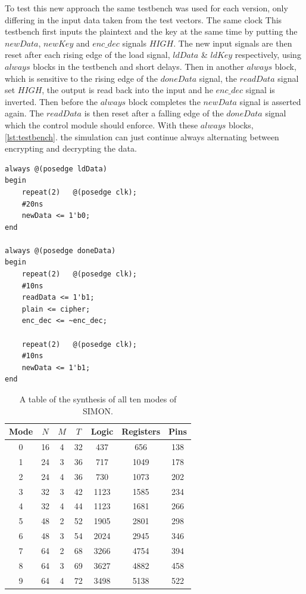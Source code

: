 \documentclass[12pt,twoside,a4paper]{report}
\begin{document}
	
	To test this new approach the same testbench was used for each version, only differing in the input data taken from the test vectors. The same clock This testbench first inputs the plaintext and the key at the same time by putting the $newData$, $newKey$ and $enc\_dec$ signals $HIGH$. The new input signals are then reset after each rising edge of the load signal, $ldData$ \& $ldKey$ respectively, using $always$ blocks in the testbench and short delays. Then in another $always$ block, which is sensitive to the rising edge of the $doneData$ signal, the $readData$ signal set $HIGH$, the output is read back into the input and he $enc\_dec$ signal is inverted. Then before the $always$ block completes the $newData$ signal is asserted again. The $readData$ is then reset after a falling edge of the $doneData$ signal which the control module should enforce. With these $always$ blocks, \autoref{lst:testbench}. the simulation can just continue always alternating between encrypting and decrypting the data.

	\begin{minipage}{\linewidth}
	\begin{lstlisting}[label={lst:testbench},caption={The $always$ blocks of the testnches},style=SVStyle]
always @(posedge ldData)
begin
	repeat(2)	@(posedge clk);
	#20ns
	newData <= 1'b0;
end

always @(posedge doneData)
begin
	repeat(2)	@(posedge clk);
	#10ns
	readData <= 1'b1;
	plain <= cipher;
	enc_dec <= ~enc_dec;
	
	repeat(2)	@(posedge clk);
	#10ns
	newData <= 1'b1;
end
	\end{lstlisting}
	\end{minipage}

	\begin{table}[H]
	\centering
	\begin{tabular}{||c|c|c|c|c|c|c||}
		\hline \hline
		Mode  & $N$ & $M$ & $T$ & Logic & Registers & Pins\\
		\hline \hline
		0 & 16 & 4 & 32 & 437 &	656 &	138 \\
		\hline
		1 & 24 & 3 & 36 & 717	& 1049 & 178  \\
		2 & 24 & 4 & 36 & 730 &	1073 & 202  \\
		\hline
		3 & 32 & 3 & 42 & 1123 & 1585 &	234  \\
		4 & 32 & 4 & 44 & 1123 & 1681 &	266	\\
		\hline
		5 & 48 & 2 & 52 & 1905 & 2801 &	298  \\
		6 & 48 & 3 & 54 & 2024 & 2945 & 346 \\
		\hline
		7 & 64 & 2 & 68 & 3266 & 4754 & 394  \\
		8 & 64 & 3 & 69 & 3627 & 4882 & 458 \\
 		9 & 64 & 4 & 72 & 3498 & 5138 &	522 \\
		\hline \hline
	\end{tabular}
	\caption{A table of the synthesis of all ten modes of SIMON.}
	\label{table:synth2}
	\end{table}  
	
\end{document}
